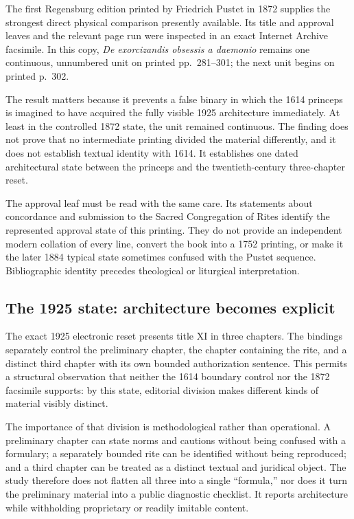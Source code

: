 The first Regensburg edition printed by Friedrich Pustet in 1872 supplies the
strongest direct physical comparison presently available. Its title and
approval leaves and the relevant page run were inspected in an exact Internet
Archive facsimile. In this copy, \emph{De exorcizandis obsessis a daemonio}
remains one continuous, unnumbered unit on printed pp.~281--301; the next unit
begins on printed p.~302.

The result matters because it prevents a false binary in which the 1614
princeps is imagined to have acquired the fully visible 1925 architecture
immediately. At least in the controlled 1872 state, the unit remained
continuous. The finding does not prove that no intermediate printing divided
the material differently, and it does not establish textual identity with
1614. It establishes one dated architectural state between the princeps and
the twentieth-century three-chapter reset.

The approval leaf must be read with the same care. Its statements about
concordance and submission to the Sacred Congregation of Rites identify the
represented approval state of this printing. They do not provide an
independent modern collation of every line, convert the book into a 1752
printing, or make it the later 1884 typical state sometimes confused with the
Pustet sequence. Bibliographic identity precedes theological or liturgical
interpretation.

\subsection{The 1925 state: architecture becomes explicit}

The exact 1925 electronic reset presents title XI in three chapters. The
bindings separately control the preliminary chapter, the chapter containing
the rite, and a distinct third chapter with its own bounded authorization
sentence. This permits a structural observation that neither the 1614
boundary control nor the 1872 facsimile supports: by this state, editorial
division makes different kinds of material visibly distinct.

The importance of that division is methodological rather than operational.
A preliminary chapter can state norms and cautions without being confused
with a formulary; a separately bounded rite can be identified without being
reproduced; and a third chapter can be treated as a distinct textual and
juridical object. The study therefore does not flatten all three into a
single ``formula,'' nor does it turn the preliminary material into a public
diagnostic checklist. It reports architecture while withholding proprietary
or readily imitable content.

